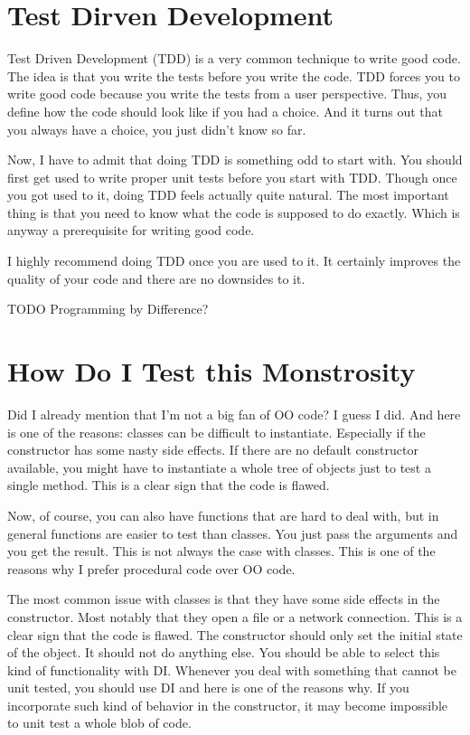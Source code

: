 \chapter{Test Dirven Development}\label{chap:tdd}

Test Driven Development (TDD) is a very common technique to write good code. The idea is that you write the tests before you write the code. TDD forces you to write good code because you write the tests from a user perspective. Thus, you define how the code should look like if you had a choice. And it turns out that you always have a choice, you just didn't know so far.

Now, I have to admit that doing TDD is something odd to start with. You should first get used to write proper unit tests before you start with TDD. Though once you got used to it, doing TDD feels actually quite natural. The most important thing is that you need to know what the code is supposed to do exactly. Which is anyway a prerequisite for writing good code.

I highly recommend doing TDD once you are used to it. It certainly improves the quality of your code and there are no downsides to it.

TODO Programming by Difference?

\chapter{How Do I Test this Monstrosity}

Did I already mention that I'm not a big fan of OO code? I guess I did. And here is one of the reasons: classes can be difficult to instantiate. Especially if the constructor has some nasty side effects. If there are no default constructor available, you might have to instantiate a whole tree of objects just to test a single method. This is a clear sign that the code is flawed.

Now, of course, you can also have functions that are hard to deal with, but in general functions are easier to test than classes. You just pass the arguments and you get the result. This is not always the case with classes. This is one of the reasons why I prefer procedural code over OO code.

The most common issue with classes is that they have some side effects in the constructor. Most notably that they open a file or a network connection. This is a clear sign that the code is flawed. The constructor should only set the initial state of the object. It should not do anything else. You should be able to select this kind of functionality with DI. Whenever you deal with something that cannot be unit tested, you should use DI and here is one of the reasons why. If you incorporate such kind of behavior in the constructor, it may become impossible to unit test a whole blob of code.

